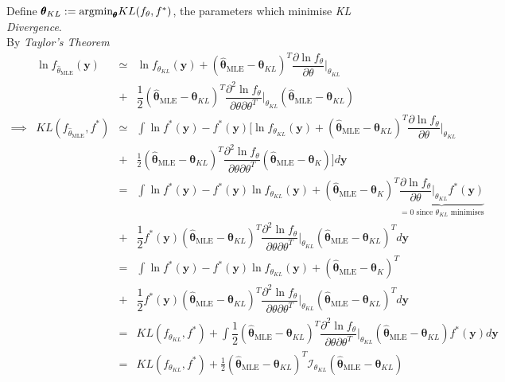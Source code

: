 \documentclass[11pt,a4paper]{article}
\begin{document}
Define $\pmb\theta_{KL}:=\text{argmin}_{\pmb\theta}KL(f_{\theta},f^*)$, the parameters which minimise \textit{KL Divergence}.\\
By \textit{Taylor's Theorem}
\[\begin{array}{rrcl}
&\ln f_{\hat\theta_\text{MLE}}(\textbf{y})&\simeq&\ln f_{\theta_{KL}}(\textbf{y})+(\hat{\pmb\theta}_\text{MLE}-\pmb\theta_{KL})^T\dfrac{\partial\ln f_\theta}{\partial\theta}\bigg|_{\theta_{KL}}\\
&&+&\dfrac12(\hat{\pmb\theta}_\text{MLE}-\pmb\theta_{KL})^T\dfrac{\partial^2\ln f_\theta}{\partial\theta\partial\theta^T}\bigg|_{\theta_{KL}}(\hat{\pmb\theta}_\text{MLE}-\pmb\theta_{KL})\\
\implies&KL(f_{\hat\theta_\text{MLE}},f^*)&\simeq&\displaystyle\int\ln f^*(\textbf{y})-f^*(\textbf{y})\bigg[\ln f_{\theta_{KL}}(\textbf{y})+(\hat{\pmb\theta}_\text{MLE}-\pmb\theta_{KL})^T\dfrac{\partial\ln f_\theta}{\partial\theta}\bigg|_{\theta_{KL}}\\
&&+&\frac12(\hat{\pmb\theta}_\text{MLE}-\pmb\theta_{KL})^T\dfrac{\partial^2\ln f_\theta}{\partial\theta\partial\theta^T}(\hat{\pmb\theta}_\text{MLE}-\pmb\theta_K)\bigg]d\textbf{y}\\
&&=&\displaystyle\int\ln f^*(\textbf{y})-f^*(\textbf{y})\ln f_{\theta_{KL}}(\textbf{y})+(\hat{\pmb\theta}_\text{MLE}-\pmb\theta_K)^T\underbrace{\dfrac{\partial \ln f_\theta}{\partial\theta}\bigg|_{\theta_{KL}}f^*(\textbf{y})}_{=0\text{ since }\theta_{KL}\text{ minimises}}\\
&&+&\dfrac12f^*(\textbf{y})(\hat{\pmb\theta}_\text{MLE}-\pmb\theta_{KL})^T\dfrac{\partial^2\ln f_\theta}{\partial\theta\partial\theta^T}\bigg|_{\theta_{KL}}(\hat{\pmb\theta}_\text{MLE}-\pmb\theta_{KL})^Td\textbf{y}\\
&&=&\displaystyle\int\ln f^*(\textbf{y})-f^*(\textbf{y})\ln f_{\theta_{KL}}(\textbf{y})+(\hat{\pmb\theta}_\text{MLE}-\pmb\theta_K)^T\\
&&+&\dfrac12f^*(\textbf{y})(\hat{\pmb\theta}_\text{MLE}-\pmb\theta_{KL})^T\dfrac{\partial^2\ln f_\theta}{\partial\theta\partial\theta^T}\bigg|_{\theta_{KL}}(\hat{\pmb\theta}_\text{MLE}-\pmb\theta_{KL})^Td\textbf{y}\\
&&=&KL(f_{\theta_{KL}},f^*)+\displaystyle\int\dfrac12(\hat{\pmb\theta}_\text{MLE}-\pmb\theta_{KL})^T\dfrac{\partial^2\ln f_\theta}{\partial\theta\partial\theta^T}\bigg|_{\theta_{KL}}(\hat{\pmb\theta}_\text{MLE}-\pmb\theta_{KL})f^*(\textbf{y})d\textbf{y}\\
&&=&KL(f_{\theta_{KL}},f^*)+\frac12(\hat{\pmb\theta}_\text{MLE}-\pmb\theta_{KL})^T\mathcal{I}_{\theta_{KL}}(\hat{\pmb\theta}_\text{MLE}-\pmb\theta_{KL})
\end{array}\]
\end{document}
